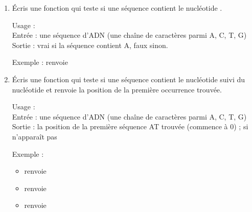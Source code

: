 \documentclass[11pt,class=report,crop=false]{standalone}
\begin{document}
\begin{activite}[ADN]

\begin{enumerate}
  \item Écris une fonction  qui teste si une séquence contient le nucléotide .
  
  \begin{fonction}[\ci{presence_de_A()}]
  Usage :  \\
  Entrée : une séquence d'ADN (une chaîne de caractères parmi A, C, T, G) \\
  Sortie : \og{}vrai\fg{} si la séquence contient \og{}A\fg{}, \og{}faux\fg{} sinon.
  
  \medskip
    
  Exemple :  renvoie 
  \end{fonction}
  
  \item Écris une fonction  qui teste si une séquence contient le nucléotide  suivi du nucléotide  et renvoie la position de la première occurrence trouvée.
  
  \begin{fonction}[\ci{position_de_AT()}]
  Usage :  \\
  Entrée : une séquence d'ADN (une chaîne de caractères parmi A, C, T, G) \\
  Sortie : la position de la première séquence \og{}AT\fg{} trouvée (commence à 0) ;  si n'apparaît pas
  
  \medskip
    
  Exemple : 
  \begin{itemize}  
    \item {} renvoie 
    \item {} renvoie 
    \item {} renvoie 
  \end{itemize} 
  \end{fonction}
  

\end{enumerate}
\end{activite}
\end{document}
